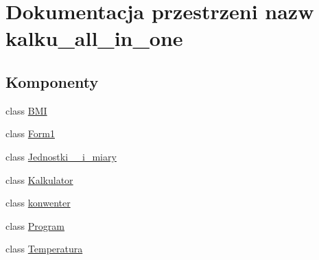 \hypertarget{namespacekalku__all__in__one}{}\section{Dokumentacja przestrzeni nazw kalku\+\_\+all\+\_\+in\+\_\+one}
\label{namespacekalku__all__in__one}
\subsection*{Komponenty}
\begin{DoxyCompactItemize}
\item 
class \mbox{\hyperlink{classkalku__all__in__one_1_1_b_m_i}{B\+MI}}
\item 
class \mbox{\hyperlink{classkalku__all__in__one_1_1_form1}{Form1}}
\item 
class \mbox{\hyperlink{classkalku__all__in__one_1_1_jednostki____i__miary}{Jednostki\+\_\+\+\_\+i\+\_\+miary}}
\item 
class \mbox{\hyperlink{classkalku__all__in__one_1_1_kalkulator}{Kalkulator}}
\item 
class \mbox{\hyperlink{classkalku__all__in__one_1_1konwenter}{konwenter}}
\item 
class \mbox{\hyperlink{classkalku__all__in__one_1_1_program}{Program}}
\item 
class \mbox{\hyperlink{classkalku__all__in__one_1_1_temperatura}{Temperatura}}
\end{DoxyCompactItemize}
